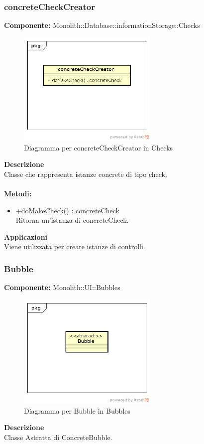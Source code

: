 \subsubsection{concreteCheckCreator}
\textbf{Componente:}  Monolith::Database::informationStorage::Checks\\
   \FloatBarrier
   \begin{figure}[ht]
   \centering
   \includegraphics[width=0.6\textwidth]{img/single-concreteCheckCreator}
   \caption{{Diagramma per concreteCheckCreator in Checks}}
\end{figure}
\FloatBarrier
\textbf{Descrizione}\\
Classe che rappresenta istanze concrete di tipo check. \\\\ 
\textbf{Metodi:} \begin{itemize}\item +doMakeCheck() : concreteCheck \\Ritorna un'istanza di concreteCheck.\end{itemize} 


\textbf{Applicazioni}\\
Viene utilizzata per creare istanze di controlli. 


\clearpage

\subsubsection{Bubble}
\textbf{Componente:}  Monolith::UI::Bubbles\\
   \FloatBarrier
   \begin{figure}[ht]
   \centering
   \includegraphics[width=0.6\textwidth]{img/single-Bubble}
   \caption{{Diagramma per Bubble in Bubbles}}
\end{figure}
\FloatBarrier
\textbf{Descrizione}\\
Classe Astratta di ConcreteBubble. 


